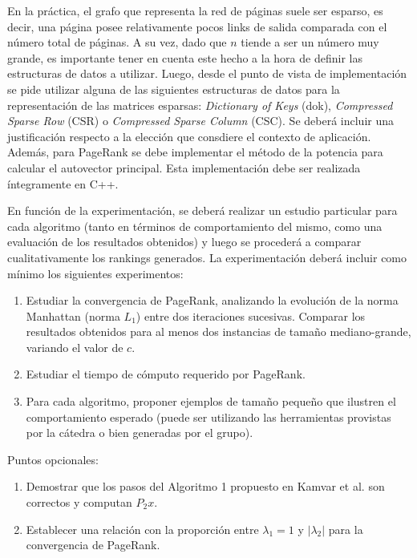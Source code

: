 \documentclass[11pt, a4paper]{article}
\begin{document}
En la pr\'actica, el grafo que representa la red de p\'aginas suele ser esparso, es decir, una p\'agina posee relativamente pocos links de salida comparada 
con el n\'umero total de p\'aginas. A su vez, dado que $n$ tiende a ser un n\'umero muy grande, es importante tener en cuenta este hecho a la hora de definir 
las estructuras de datos a utilizar. Luego, desde el punto de vista de implementaci\'on se pide utilizar alguna de las siguientes estructuras de datos para 
la representaci\'on de las matrices esparsas: \emph{Dictionary of Keys} (dok), \emph{Compressed Sparse Row} (CSR) o \emph{Compressed Sparse Column} (CSC). 
Se deber\'a incluir una justificaci\'on respecto a la elecci\'on que consdiere el contexto de aplicaci\'on. Adem\'as, para PageRank se debe implementar el 
m\'etodo de la potencia para calcular el autovector principal. Esta implementaci\'on debe ser realizada \'integramente en \textsc{C++}.

En funci\'on de la experimentaci\'on, se deber\'a realizar un estudio particular para cada algoritmo (tanto en t\'erminos de comportamiento
del mismo, como una evaluaci\'on de los resultados obtenidos) y luego se proceder\'a a comparar cualitativamente los rankings generados.
La experimentaci\'on deber\'a incluir como m\'inimo los siguientes experimentos:
\begin{enumerate}
\item Estudiar la convergencia de PageRank, analizando la evoluci\'on de la norma Manhattan (norma $L_1$) entre dos iteraciones sucesivas. Comparar los 
resultados obtenidos para al menos dos instancias de tama\~no mediano-grande, variando el valor de $c$. 
\item Estudiar el tiempo de c\'omputo requerido por PageRank. 
\item Para cada algoritmo, proponer ejemplos de tama\~no peque\~no que ilustren el comportamiento esperado (puede ser utilizando las herramientas provistas
por la c\'atedra o bien generadas por el grupo).
\end{enumerate}

Puntos opcionales:
\begin{enumerate}
\item Demostrar que los pasos del Algoritmo 1 propuesto en Kamvar et al. \cite{Kamvar2003} son correctos y computan $P_2 x$.
\item Establecer una relaci\'on con la proporci\'on entre $\lambda_1 = 1$ y $|\lambda_2|$ para la convergencia de PageRank.
\end{enumerate}
\end{document}
